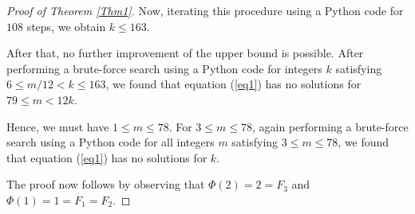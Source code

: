 \documentclass[10pt,a4paper]{amsart}
\begin{document}
\begin{proof}[Proof of Theorem \ref{Thm1}]
Now, iterating this procedure using a Python code \cite{Sagar} for $108$ steps, we obtain $k\leq 163$.

After that, no further improvement of the upper bound is possible.
After performing a brute-force search using a Python code \cite{Sagar} for integers $k$ satisfying $6\leq m/12<k\leq 163$, we found that equation (\ref{eq1}) has no solutions for $79\leq m<12k$.

Hence, we must have $1\leq m\leq 78$.
For $3\leq m\leq 78$, again performing a brute-force search using a Python code \cite{Sagar} for all integers $m$ satisfying $3\leq m\leq 78$, we found that equation (\ref{eq1}) has no solutions for $k$.

The proof now follows by observing that $\Phi(2)=2=F_3$ and $\Phi(1)=1=F_1=F_2$.
\end{proof}
\end{document}
